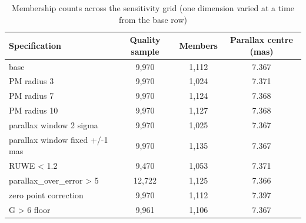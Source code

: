 \begin{table}[t]
\centering
\begin{threeparttable}
\caption{Membership counts across the sensitivity grid (one dimension varied at a time from the base row)}
\label{tab:grid}
\begin{tabular}{lccc}
\toprule
Specification & Quality sample & Members & Parallax centre (mas) \\
\midrule
base & 9,970 & 1,112 & 7.367 \\
PM radius 3 & 9,970 & 1,024 & 7.371 \\
PM radius 7 & 9,970 & 1,124 & 7.368 \\
PM radius 10 & 9,970 & 1,127 & 7.368 \\
parallax window 2 sigma & 9,970 & 1,025 & 7.367 \\
parallax window fixed +/-1 mas & 9,970 & 1,135 & 7.367 \\
RUWE < 1.2 & 9,470 & 1,053 & 7.371 \\
parallax\_over\_error > 5 & 12,722 & 1,125 & 7.366 \\
zero point correction & 9,970 & 1,112 & 7.397 \\
G > 6 floor & 9,961 & 1,106 & 7.367 \\
\bottomrule
\end{tabular}
\end{threeparttable}
\end{table}
